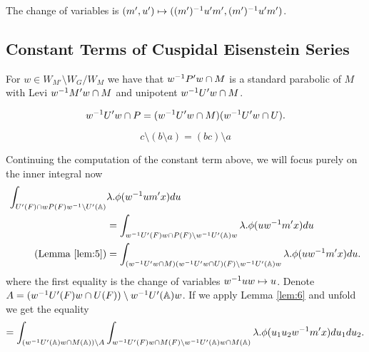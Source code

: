     The change of variables is \((m', u') \mapsto ((m')^{-1} u' m', (m')^{-1} u' m')\).

\subsection{Constant Terms of Cuspidal Eisenstein Series}
\begin{Lemma}\label{lem:4}
        For \(w\in W_{M'}\setminus W_G / W_{M} \) we have that \(w^{-1} P'w\cap M\) is a standard parabolic of \(M\) with Levi \(w^{-1} M'w\cap M\) and unipotent \(w^{-1} U'w\cap M\).
    \end{Lemma}
    \begin{Lemma}\label{lem:5}
        \[w^{-1} U' w \cap P = (w^{-1} U' w \cap M)(w^{-1} U' w \cap U).\]
    \end{Lemma}
    \begin{Lemma}\label{lem:6}
        \[c\setminus (b\setminus a )= (bc)\setminus a\]
    \end{Lemma}
    Continuing the computation of the constant term above, we will focus purely on the inner integral now
    \begin{equation*}
        \begin{aligned}
            \int_{U'(F)\cap wP(F)w\inv \setminus U'(\A)}& \lambda.\phi( w\inv um' x)  du \\&= \int_{w\inv U'(F)w \cap P(F) \setminus w\inv U'(\A)w} \lambda.\phi( uw\inv m' x)  du \\
            (\text{Lemma \ref{lem:5}})&= \int_{(w\inv U' w \cap M)(w\inv U' w \cap U)(F) \setminus w\inv U'(\A)w} \lambda.\phi( uw\inv m' x)  du . \\
        \end{aligned}
    \end{equation*}
    where the first equality is the change of variables \(w^{-1} u w\mapsto u \). Denote \(A = (w\inv U'(F) w \cap U(F) ) \setminus w\inv U'(\A)w \). If we apply Lemma \ref{lem:6} and unfold we get the equality
    \[= \int_{(w\inv U'(\A)w \cap M(\A)) \setminus A} \int_{w\inv U'(F) w \cap M(F) \setminus w\inv U'(\A)w \cap M(\A)} \lambda.\phi( u_1 u_2 w\inv m' x)  du_1 du_2.\]
